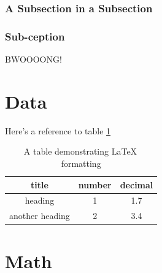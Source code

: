 \documentclass{workreport}
\begin{document}
\begin{body}
\subsubsection{A Subsection in a Subsection}

	\lipsum[1]

\subsubsection{Sub-ception}

	\lipsum[1]

	BWOOOONG!

\section{Data}

	\lipsum[1-2]
	
Here's a reference to table \ref{tbl:exampletable}

\begin{table}
	
	\centering
	
	\begin{tabular}{|c|c|c|} \hline
		title & number & decimal \\ \hline
		heading & 1 & 1.7 \\ \hline
		another heading & 2 & 3.4 \\ \hline
	\end{tabular}
	\caption{A table demonstrating \LaTeX \, formatting}
	
	\label{tbl:exampletable}
	
\end{table}

\section{Math}


\end{body}
\end{document}
